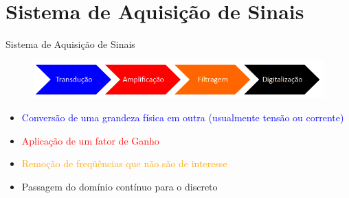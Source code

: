 \documentclass[aspectratio=169,
				xcolor=table]{beamer}
\begin{document}
	
	\section{Sistema de Aquisição de Sinais}
	\begin{frame}{Sistema de Aquisição de Sinais}
		
		\begin{figure}[hbtp]
			\centering
			\includegraphics[width=\textwidth, keepaspectratio]{../figs/cap01/sistema01.png}
		\end{figure}		
		
		\begin{itemize}
			\item \textcolor{blue}{Conversão de uma grandeza física em outra (usualmente tensão ou corrente)}
			\item \textcolor{red}{Aplicação de um fator de Ganho}
			\item \textcolor{orange}{Remoção de freqüências que não são de interesse}
			\item  Passagem do domínio contínuo para o discreto
		\end{itemize}
		
	\end{frame}
	
\end{document}
